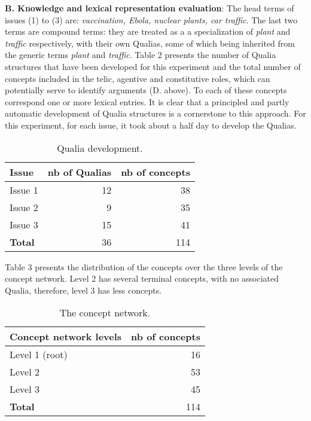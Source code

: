 \documentclass[11pt,letterpaper]{article}
\begin{document}
{\bf B. Knowledge and lexical representation evaluation}:
The head terms of issues (1) to (3) are: {\it vaccination, Ebola, nuclear plants, car traffic}. The last two terms are compound terms: they are treated
as a a specialization of  {\it plant} and {\it traffic} respectively, with their own Qualias, some of which being inherited from the generic terms {\it plant} and {\it traffic}.
Table 2 presents the number of Qualia structures that have been developed for this experiment and the total number of concepts included in the telic, agentive and constitutive roles, which can potentially serve to identify arguments (D. above). To each of these concepts correspond one or more lexical entries.
It is clear that a principled and partly automatic development of Qualia structures is a cornerstone to this approach. For this experiment, for each issue, it took about a half day to develop the Qualias.
\begin{table}
\small
\centering
\begin{tabular}{|l|r | r|}
\hline \bf Issue & \bf nb of Qualias  & \bf nb of concepts \\ \hline
Issue 1 & 12 & 38 \\
Issue 2 & 9 & 35\\
Issue 3 & 15 & 41\\
\hline
\bf Total & 36 & 114\\
\hline
\end{tabular}
\caption{\label{font-table} Qualia development.}
\end{table}

Table 3 presents the distribution of the concepts over the three levels of the concept network. Level 2 has several terminal concepts, with no associated Qualia, therefore, level 3 has less concepts.

\begin{table}
\small
\centering
\begin{tabular}{|l|r | }
\hline \bf Concept network levels & \bf nb of concepts  \\ \hline
Level 1 (root) & 16 \\
Level 2 &  53 \\
Level 3 & 45 \\
\hline
\bf Total &  114\\
\hline
\end{tabular}
\caption{\label{concept} The concept network.}
\end{table}
\end{document}
